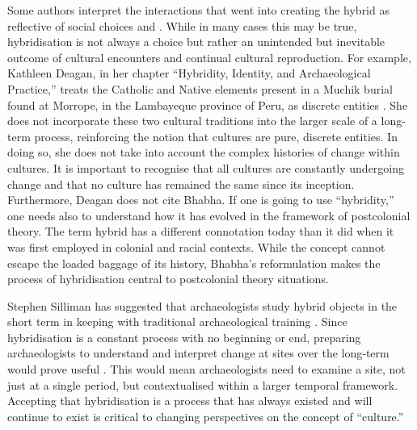 	Some authors interpret the interactions that went into creating the hybrid as reflective of social choices \parencite{Deagan_2013} and \parencite{Silliman_2009}. While in many cases this may be true, hybridisation is not always a choice but rather an unintended but inevitable outcome of cultural encounters and continual cultural reproduction. For example, Kathleen Deagan, in her chapter “Hybridity, Identity, and Archaeological Practice,” treats the Catholic and Native elements present in a Muchik burial found at Morrope, in the Lambayeque province of Peru, as discrete entities \parencite[267]{Deagan_2013}. She does not incorporate these two cultural traditions into the larger scale of a long-term process, reinforcing the notion that cultures are pure, discrete entities. In doing so, she does not take into account the complex histories of change within cultures. It is important to recognise that all cultures are constantly undergoing change and that no culture has remained the same since its inception. Furthermore, Deagan does not cite Bhabha. If one is going to use “hybridity,” one needs also to understand how it has evolved in the framework of postcolonial theory. The term hybrid has a different connotation today than it did when it was first employed in colonial and racial contexts. While the concept cannot escape the loaded baggage of its history, Bhabha’s reformulation makes the process of hybridisation central to postcolonial theory situations. 

	Stephen Silliman has suggested that archaeologists study hybrid objects in the short term in keeping with traditional archaeological training \parencite{Silliman_2014}. Since hybridisation is a constant process with no beginning or end, preparing archaeologists to understand and interpret change at sites over the long‐term would prove useful \parencite{Lightfoot_1995}. This would mean archaeologists need to examine a site, not just at a single period, but contextualised within a larger temporal framework. Accepting that hybridisation is a process that has always existed and will continue to exist is critical to changing perspectives on the concept of “culture.” 

